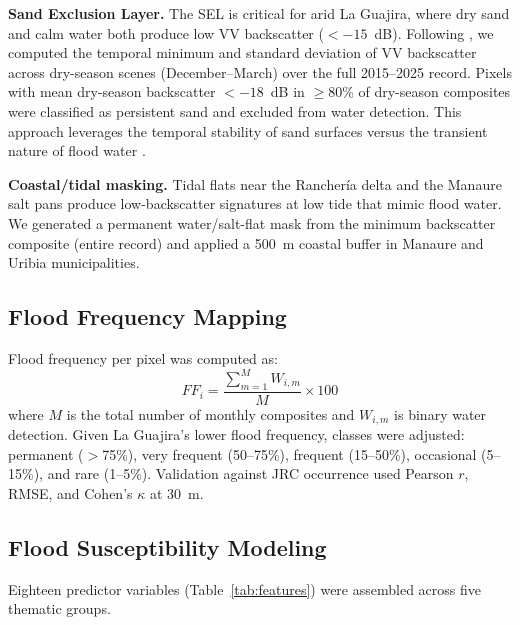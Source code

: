 \documentclass{article}
\begin{document}
\textbf{Sand Exclusion Layer.} The SEL is critical for arid La Guajira, where dry sand and calm water both produce low VV backscatter ($< -15$~dB). Following \citet{Martinis2018}, we computed the temporal minimum and standard deviation of VV backscatter across dry-season scenes (December--March) over the full 2015--2025 record. Pixels with mean dry-season backscatter $< -18$~dB in $\geq$80\% of dry-season composites were classified as persistent sand and excluded from water detection. This approach leverages the temporal stability of sand surfaces versus the transient nature of flood water \citep{Garg2024}.

\textbf{Coastal/tidal masking.} Tidal flats near the Rancher\'ia delta and the Manaure salt pans produce low-backscatter signatures at low tide that mimic flood water. We generated a permanent water/salt-flat mask from the minimum backscatter composite (entire record) and applied a \SI{500}{\metre} coastal buffer in Manaure and Uribia municipalities.

\subsection{Flood Frequency Mapping}

Flood frequency per pixel was computed as:
\begin{equation}
    FF_i = \frac{\sum_{m=1}^{M} W_{i,m}}{M} \times 100
    \label{eq:flood_freq}
\end{equation}
where $M$ is the total number of monthly composites and $W_{i,m}$ is binary water detection. Given La Guajira's lower flood frequency, classes were adjusted: permanent ($>$75\%), very frequent (50--75\%), frequent (15--50\%), occasional (5--15\%), and rare (1--5\%). Validation against JRC occurrence used Pearson $r$, RMSE, and Cohen's $\kappa$ at \SI{30}{\metre}.

\subsection{Flood Susceptibility Modeling}

Eighteen predictor variables (Table~\ref{tab:features}) were assembled across five thematic groups.
\end{document}
